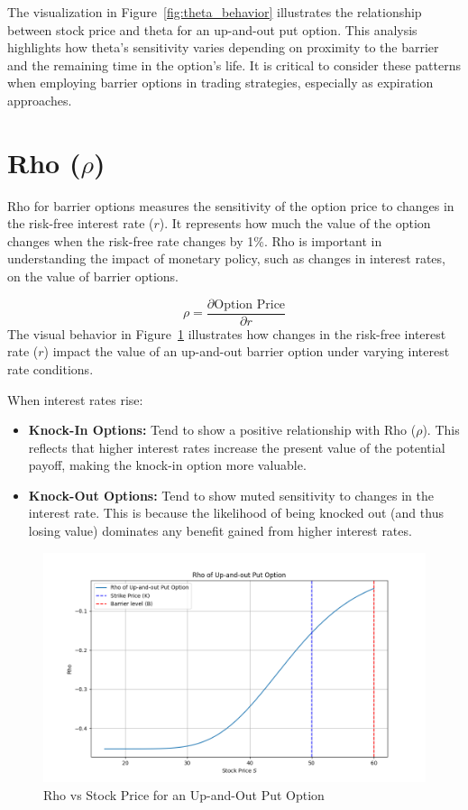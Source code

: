 The visualization in Figure~\ref{fig:theta_behavior} illustrates the relationship between stock price and theta for an up-and-out put option. This analysis highlights how theta's sensitivity varies depending on proximity to the barrier and the remaining time in the option's life. It is critical to consider these patterns when employing barrier options in trading strategies, especially as expiration approaches.


\section{Rho (\(\rho\))}

Rho for barrier options measures the sensitivity of the option price to changes in the risk-free interest rate (\(r\)). It represents how much the value of the option changes when the risk-free rate changes by 1\%. Rho is important in understanding the impact of monetary policy, such as changes in interest rates, on the value of barrier options.

\[
\rho = \frac{\partial \text{Option Price}}{\partial r}
\]
The visual behavior in Figure~\ref{fig:rho_behavior} illustrates how changes in the risk-free interest rate (\(r\)) impact the value of an up-and-out barrier option under varying interest rate conditions. 

When interest rates rise:
\begin{itemize}
    \item \textbf{Knock-In Options:} Tend to show a positive relationship with Rho (\(\rho\)). This reflects that higher interest rates increase the present value of the potential payoff, making the knock-in option more valuable.
    \item \textbf{Knock-Out Options:} Tend to show muted sensitivity to changes in the interest rate. This is because the likelihood of being knocked out (and thus losing value) dominates any benefit gained from higher interest rates.
\end{itemize}
\begin{figure}[h]
    \centering
    \includegraphics[width=.65\linewidth]{content/images/rho.png}
    \caption{Rho vs Stock Price for an Up-and-Out Put Option}
    \label{fig:rho_behavior}
\end{figure}

